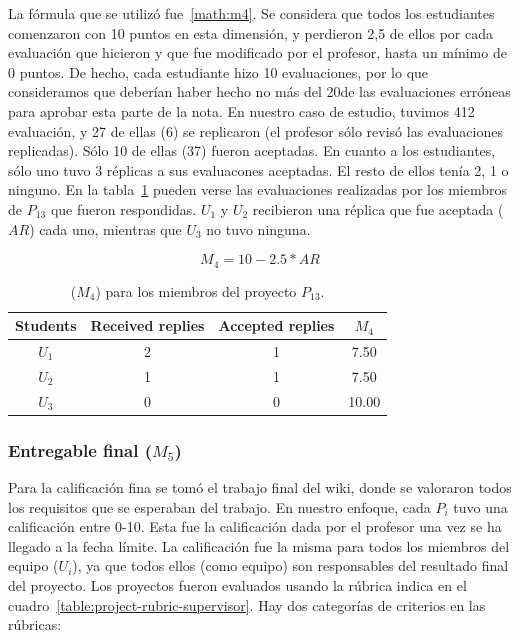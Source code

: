 La fórmula que se utilizó fue~\ref{math:m4}. Se considera que todos los estudiantes comenzaron con 10 puntos en esta dimensión, y perdieron 2,5 de ellos por cada evaluación que hicieron  y que fue modificado por el profesor, hasta un mínimo de 0 puntos. De hecho, cada estudiante hizo 10 evaluaciones, por lo que consideramos que deberían haber hecho no más del 20\percentage de las evaluaciones erróneas para aprobar esta parte de la nota. En nuestro caso de estudio, tuvimos 412 evaluación, y 27 de ellas (6\percentage) se replicaron (el profesor sólo revisó las evaluaciones replicadas). Sólo 10 de ellas (37\percentage) fueron aceptadas. En cuanto a los estudiantes, sólo uno tuvo 3 réplicas a sus evaluacones aceptadas. El resto de ellos tenía 2, 1 o ninguno. En la tabla~\ref{table:students-grade-replies} pueden verse las evaluaciones realizadas por los miembros de $P_{13}$ que fueron respondidas. $U_1$ y $U_2$ recibieron una réplica que fue aceptada ($AR$) cada uno, mientras que $U_3 $ no tuvo ninguna.

\begin{equation}
    \textbf{$M_4 = 10 - 2.5 * AR$}
    \label{math:m4}
\end{equation}

\begin{table}[h]
\centering
\begin{tabular}{|c|c|c|c|}
\hline
\textbf{Students} & \textbf{Received replies} & \textbf{Accepted replies} & \textbf{$M_4$}  \\ \hline
\hline
 $U_1$ & 2 & 1 & 7.50  \\ \hline
 $U_2$ & 1 & 1 & 7.50 \\ \hline
 $U_3$ & 0 & 0 & 10.00  \\ \hline
\end{tabular}
\caption{($M_4$) para los miembros del proyecto $P_{13}$.}
\label{table:students-grade-replies}
\end{table}

\subsubsection{Entregable final ($M_5$)}

Para la calificación fina se tomó el trabajo final del wiki, donde se valoraron todos los requisitos que se esperaban del trabajo. En nuestro enfoque, cada $P_i$ tuvo una calificación entre 0-10. Esta fue la calificación dada por el profesor una vez se ha llegado a la fecha límite. La calificación fue la misma para todos los miembros del equipo ($U_i$), ya que todos ellos (como equipo) son responsables del resultado final del proyecto. Los proyectos fueron evaluados usando la rúbrica indica en el cuadro~\ref{table:project-rubric-supervisor}. Hay dos categorías de criterios en las rúbricas:

